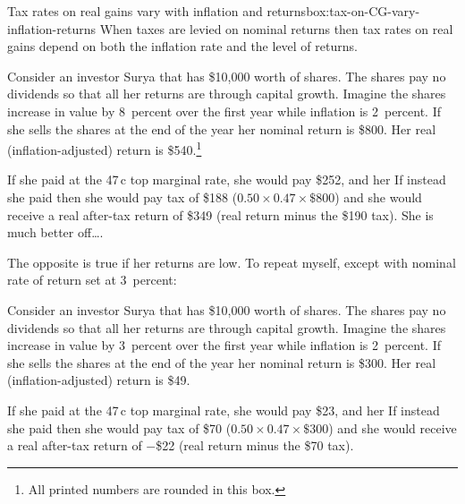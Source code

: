 \documentclass{grattan}\usepackage[]{graphicx}\usepackage[]{color}
\begin{document}
\begin{smallbox}{Tax rates on real gains vary with inflation and returns}{box:tax-on-CG-vary-inflation-returns}
When taxes are levied on nominal returns then tax rates on real gains depend on both the inflation rate and the level of returns. 



Consider an investor Surya that has \$10,000 worth of shares. The shares pay no dividends so that all her returns are through capital growth.
Imagine the shares increase in value by 8~percent over the first year while inflation is 2~percent. If she sells the shares at the end of the year her nominal return is \$800. Her real (inflation-adjusted) return is \$540.\footnote{All printed numbers are rounded in this box.}

If she paid  at the 47\,c top marginal rate, she would pay \$252, and her  If instead she paid  then she would pay tax of \$188 ($0.50 \times 0.47 \times \$800$) and she would receive a real after-tax return of \$349 (real return minus the \$190 tax). She is much better off\dots.



The opposite is true if her returns are low. To repeat myself, except with nominal rate of return set at 3~percent:

Consider an investor Surya that has \$10,000 worth of shares. The shares pay no dividends so that all her returns are through capital growth.
Imagine the shares increase in value by 3~percent over the first year while inflation is 2~percent. If she sells the shares at the end of the year her nominal return is \$300. Her real (inflation-adjusted) return is \$49.

If she paid  at the 47\,c top marginal rate, she would pay \$23, and her  If instead she paid  then she would pay tax of \$70 ($0.50 \times 0.47 \times \$300$) and she would receive a real after-tax return of $-$\$22 (real return minus the \$70 tax).

\end{smallbox}
\end{document}
